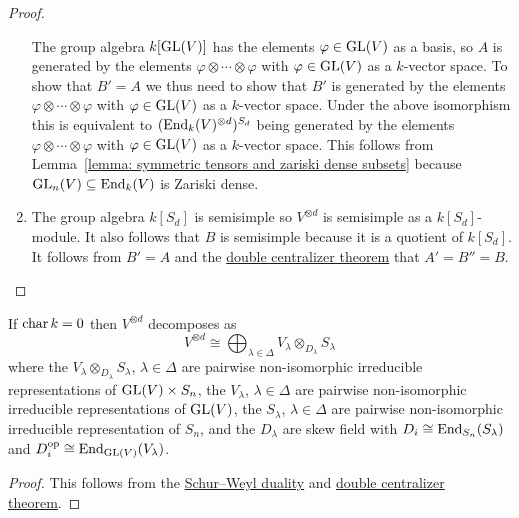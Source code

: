 \begin{proof}
\begin{enumerate}
      The group algebra $k[\operatorname{GL}(V)]$ has the elements $\varphi \in \operatorname{GL}(V)$ as a basis, so $A$ is generated by the elements $\varphi \otimes \dotsb \otimes \varphi$ with $\varphi \in \operatorname{GL}(V)$ as a $k$-vector space.
      To show that $B' = A$ we thus need to show that $B'$ is generated by the elements $\varphi \otimes \dotsb \otimes \varphi$ with $\varphi \in \operatorname{GL}(V)$ as a $k$-vector space.
      Under the above isomorphism this is equivalent to $(\operatorname{End}_k(V)^{\otimes d})^{S_d}$ being generated by the elements $\varphi \otimes \dotsb \otimes \varphi$ with $\varphi \in \operatorname{GL}(V)$ as a $k$-vector space.
      This follows from Lemma~\ref{lemma: symmetric tensors and zariski dense subsets} because $\operatorname{GL}_n(V) \subseteq \operatorname{End}_k(V)$ is Zariski dense.
    \item
      The group algebra $k[S_d]$ is semisimple so $V^{\otimes d}$ is semisimple as a $k[S_d]$-module.
      It also follows that $B$ is semisimple because it is a quotient of $k[S_d]$.
      It follows from $B' = A$ and the \hyperref[corollary: special double centralizer theorem]{double centralizer theorem} that $A' = B'' = B$.
    \qedhere
  \end{enumerate}
\end{proof}


\begin{corollary}
  If $\operatorname{char} k = 0$ then $V^{\otimes d}$ decomposes as
  \[
          V^{\otimes d}
    \cong \bigoplus_{\lambda \in \Delta} V_\lambda \otimes_{D_\lambda} S_\lambda
  \]
  where the $V_\lambda \otimes_{D_\lambda} S_\lambda$, $\lambda \in \Delta$ are pairwise non-isomorphic irreducible representations of $\operatorname{GL}(V) \times S_n$, the $V_\lambda$, $\lambda \in \Delta$ are pairwise non-isomorphic irreducible representations of $\operatorname{GL}(V)$, the $S_\lambda$, $\lambda \in \Delta$ are pairwise non-isomorphic irreducible representation of $S_n$, and the $D_\lambda$ are skew field with $D_i \cong \operatorname{End}_{S_n}(S_\lambda)$ and $D_i^{\operatorname{op}} \cong \operatorname{End}_{\operatorname{GL}(V)}(V_\lambda)$.
\end{corollary}


\begin{proof}
  This follows from the \hyperref[theorem: schur weyl duality]{Schur--Weyl duality} and \hyperref[corollary: special double centralizer theorem]{double centralizer theorem}.
\end{proof}


